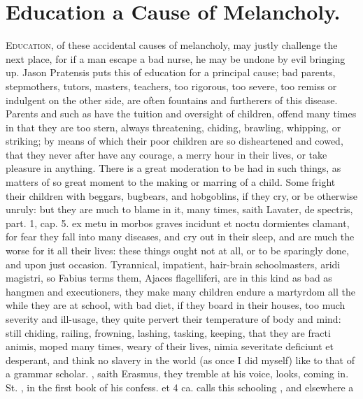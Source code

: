 {{%
\section{Education a Cause of Melancholy.}

\lettrine{E}{ducation}, of these accidental causes of melancholy, may justly
challenge the next place, for if a man escape a bad nurse, he may be
undone by evil bringing up. Jason Pratensis puts this of
education for a principal cause; bad parents, stepmothers, tutors,
masters, teachers, too rigorous, too severe, too remiss or indulgent on
the other side, are often fountains and furtherers of this disease.
Parents and such as have the tuition and oversight of children, offend
many times in that they are too stern, always threatening, chiding,
brawling, whipping, or striking; by means of which their poor children
are so disheartened and cowed, that they never after have any courage,
a merry hour in their lives, or take pleasure in anything. There is a
great moderation to be had in such things, as matters of so great
moment to the making or marring of a child. Some fright their children
with beggars, bugbears, and hobgoblins, if they cry, or be otherwise
unruly: but they are much to blame in it, many times, saith Lavater, de
spectris, part. 1, cap. 5. ex metu in morbos graves incidunt et noctu
dormientes clamant, for fear they fall into many diseases, and cry out
in their sleep, and are much the worse for it all their lives: these
things ought not at all, or to be sparingly done, and upon just
occasion. Tyrannical, impatient, hair-brain schoolmasters, aridi
magistri, so Fabius terms them, Ajaces flagelliferi, are in this
kind as bad as hangmen and executioners, they make many children endure
a martyrdom all the while they are at school, with bad diet, if they
board in their houses, too much severity and ill-usage, they quite
pervert their temperature of body and mind: still chiding, railing,
frowning, lashing, tasking, keeping, that they are fracti animis, moped
many times, weary of their lives, nimia severitate deficiunt et
desperant, and think no slavery in the world (as once I did myself)
like to that of a grammar scholar. , saith Erasmus, they tremble at his voice,
looks, coming in. St. \Austin{}, in the first book of his confess. et 4
ca. calls this schooling , and elsewhere a
}}
